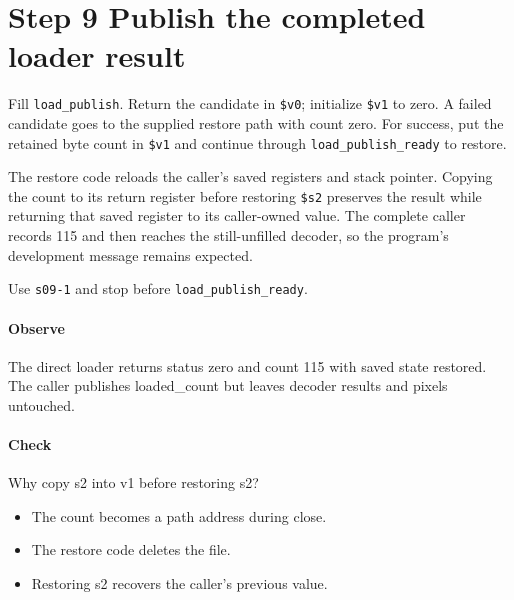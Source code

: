 \section{Step 9 Publish the completed loader result}\label{png-load-s09}
Fill \texttt{load\_publish}. Return the candidate in \texttt{\$v0}; initialize \texttt{\$v1} to zero. A failed candidate goes to the supplied restore path with count zero. For success, put the retained byte count in \texttt{\$v1} and continue through \texttt{load\_publish\_ready} to restore.

The restore code reloads the caller's saved registers and stack pointer. Copying the count to its return register before restoring \texttt{\$s2} preserves the result while returning that saved register to its caller-owned value. The complete caller records 115 and then reaches the still-unfilled decoder, so the program's development message remains expected.

Use \texttt{s09-1} and stop before \texttt{load\_publish\_ready}.

\paragraph{Observe} The direct loader returns status zero and count 115 with saved state restored. The caller publishes loaded\_count but leaves decoder results and pixels untouched.

\paragraph{Check} Why copy s2 into v1 before restoring s2?
\begin{itemize}
\item[A.] The count becomes a path address during close.
\item[B.] The restore code deletes the file.
\item[C.] Restoring s2 recovers the caller's previous value.
\end{itemize}
